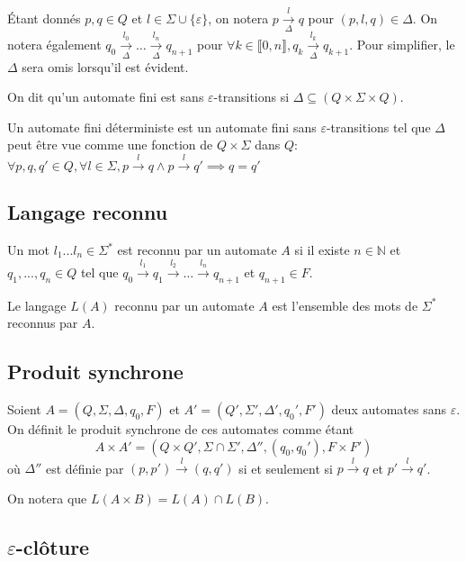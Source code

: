 \documentclass[10pt,a4paper]{article}
\newcommand{\enum}[2]{\llbracket #1, #2 \rrbracket}
\begin{document}
\'Etant donn\'es $p,q \in Q$ et $l\in \Sigma \cup \{\varepsilon\}$, on notera $p \underset{\Delta}{\overset{l}{{\to}}}q$ pour $(p,l,q) \in \Delta$. On notera \'egalement $q_0 \underset{\Delta}{\overset{l_0}{{\to}}} \dots \underset{\Delta}{\overset{l_n}{{\to}}} q_{n+1}$ pour $\forall k \in \enum{0}{n}, q_k 
\underset{\Delta}{\overset{l_k}{{\to}}} q_{k+1}$. Pour simplifier, le $\Delta$ sera omis lorsqu'il est \'evident.



On dit qu'un automate fini est sans $\varepsilon$-transitions si $\Delta \subseteq (Q\times \Sigma \times Q)$.

Un automate fini d\'eterministe est un automate fini sans $\varepsilon$-transitions tel que $\Delta$ peut \^etre vue comme une fonction de $Q\times \Sigma$ dans $Q$: $\forall p,q,q' \in Q, \forall l \in \Sigma, p\overset{l}{{\to}}q \land p\overset{l}{{\to}}q' \implies q=q'$

\subsection{Langage reconnu}

Un mot $l_1...l_n \in \Sigma^*$ est reconnu par un automate $A$ si il existe $n \in \mathbb N$ et $q_1,...,q_n \in Q$ tel que $q_0 \overset{l_1}{{\to}} q_1 \overset{l_2}{{\to}} \dots \overset{l_n}{{\to}} q_{n+1}$ et $q_{n+1} \in F$.

Le langage $L(A)$ reconnu par un automate $A$ est l'ensemble des mots de $\Sigma^*$ reconnus par $A$.

\subsection{Produit synchrone}

Soient $A = (Q, \Sigma, \Delta, q_0, F)$ et $A' = (Q', \Sigma', \Delta', q_0', F')$ deux automates sans $\varepsilon$. On définit le produit synchrone de ces automates comme \'etant $$A\times A' = (Q \times Q', \Sigma \cap \Sigma', \Delta'', (q_0, q_0'), F\times F')$$ o\`u $\Delta''$ est d\'efinie par $(p,p')\overset{l}{{\to}}(q,q')$ si et seulement si $p\overset{l}{{\to}}q$ et $p'\overset{l}{{\to}}q'$.

On notera que $L(A\times B) = L(A) \cap L(B)$.

\subsection{$\varepsilon$-clôture}
\end{document}
